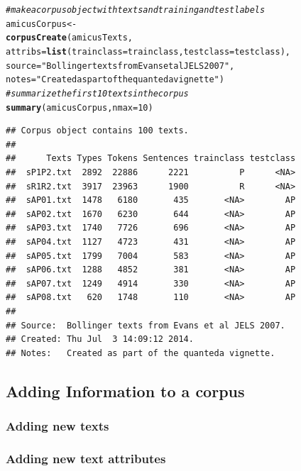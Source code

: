 \documentclass[11pt]{article}\usepackage[]{graphicx}\usepackage[]{color}
\makeatletter
\newcommand{\hlnum}[1]{\textcolor[rgb]{0.686,0.059,0.569}{#1}}%
\newcommand{\hlstr}[1]{\textcolor[rgb]{0.192,0.494,0.8}{#1}}%
\newcommand{\hlcom}[1]{\textcolor[rgb]{0.678,0.584,0.686}{\textit{#1}}}%
\newcommand{\hlstd}[1]{\textcolor[rgb]{0.345,0.345,0.345}{#1}}%
\newcommand{\hlkwb}[1]{\textcolor[rgb]{0.69,0.353,0.396}{#1}}%
\newcommand{\hlkwc}[1]{\textcolor[rgb]{0.333,0.667,0.333}{#1}}%
\newcommand{\hlkwd}[1]{\textcolor[rgb]{0.737,0.353,0.396}{\textbf{#1}}}%
\newenvironment{kframe}{%
 \def\at@end@of@kframe{}%
 \ifinner\ifhmode%
  \def\at@end@of@kframe{\end{minipage}}%
  \begin{minipage}{\columnwidth}%
 \fi\fi%
 \def\FrameCommand##1{\hskip\@totalleftmargin \hskip-\fboxsep
 \colorbox{shadecolor}{##1}\hskip-\fboxsep
     \hskip-\linewidth \hskip-\@totalleftmargin \hskip\columnwidth}%
 \MakeFramed {\advance\hsize-\width
   \@totalleftmargin\z@ \linewidth\hsize
   \@setminipage}}%
 {\par\unskip\endMakeFramed%
 \at@end@of@kframe}
\newenvironment{knitrout}{}{} %
\makeatother
\begin{document}
\begin{knitrout}\footnotesize
{}\color{fgcolor}\begin{kframe}
\begin{alltt}
\hlcom{# make a corpus object with texts and training and test labels}
\hlstd{amicusCorpus} \hlkwb{<-}
  \hlkwd{corpusCreate}\hlstd{(amicusTexts,}
               \hlkwc{attribs} \hlstd{=} \hlkwd{list}\hlstd{(}\hlkwc{trainclass}\hlstd{=trainclass,} \hlkwc{testclass}\hlstd{=testclass),}
               \hlkwc{source} \hlstd{=} \hlstr{"Bollinger texts from Evans et al JELS 2007"}\hlstd{,}
               \hlkwc{notes} \hlstd{=} \hlstr{"Created as part of the quanteda vignette"}\hlstd{)}
\hlcom{# summarize the first 10 texts in the corpus}
\hlkwd{summary}\hlstd{(amicusCorpus,} \hlkwc{nmax}\hlstd{=}\hlnum{10}\hlstd{)}
\end{alltt}
\begin{verbatim}
## Corpus object contains 100 texts.
## 
##      Texts Types Tokens Sentences trainclass testclass
##  sP1P2.txt  2892  22886      2221          P      <NA>
##  sR1R2.txt  3917  23963      1900          R      <NA>
##  sAP01.txt  1478   6180       435       <NA>        AP
##  sAP02.txt  1670   6230       644       <NA>        AP
##  sAP03.txt  1740   7726       696       <NA>        AP
##  sAP04.txt  1127   4723       431       <NA>        AP
##  sAP05.txt  1799   7004       583       <NA>        AP
##  sAP06.txt  1288   4852       381       <NA>        AP
##  sAP07.txt  1249   4914       330       <NA>        AP
##  sAP08.txt   620   1748       110       <NA>        AP
## 
## Source:  Bollinger texts from Evans et al JELS 2007.
## Created: Thu Jul  3 14:09:12 2014.
## Notes:   Created as part of the quanteda vignette.
\end{verbatim}
\end{kframe}
\end{knitrout}

\subsection{Adding Information to a corpus}

\subsubsection{Adding new texts}



\subsubsection{Adding new text attributes}
\end{document}
